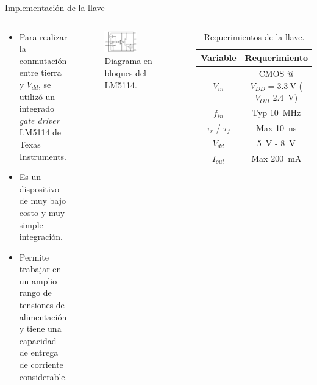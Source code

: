\documentclass{beamer}
\begin{document}
\begin{frame}{Implementación de la llave}

    \begin{columns}[c]
        \begin{block}{}
        \begin{itemize}
            \item Para realizar la conmutación entre tierra y $V_{dd}$, se utilizó
                un integrado \textit{gate driver} LM5114 de Texas Instruments.
            \item Es un dispositivo de muy bajo costo y muy simple integración.
            \item Permite trabajar en un amplio rango de tensiones de alimentación y
                tiene una capacidad de entrega de corriente considerable.
        \end{itemize}
        \end{block}
        \begin{figure}[tbp]
            \centering
            \includegraphics[width=0.6\textwidth]{images/lm5114_block_diagram.png}
            \caption{Diagrama en bloques del LM5114.} \label{fig:lm5114_block_diagram}
        \end{figure}

    {\tiny
        \begin{table}
        \centering
        \begin{tabular}{c|c}
        \hline
            Variable & Requerimiento \\
        \hline
            $V_{in}$                &   CMOS @ $V_{DD}=\qty{3.3}{\volt}$ ($V_{OH}$
            \qty{2.4}{\volt})     \\
            $f_{in}$                &   Typ \qty{10}{\mega\hertz} \\
            $\tau_{r}$ / $\tau_{f}$ &   Max \qty{10}{\nano\second} \\
            $V_{dd}$                &   \qty{5}{\volt} - \qty{8}{\volt} \\
            $I_{out}$               &   Max \qty{200}{\milli\ampere} \\
        \hline
        \end{tabular}
        \caption{Requerimientos de la llave.}
        \label{tab:llave_requirements}
        \end{table}
        }

    \end{columns}

\end{frame}
\end{document}
